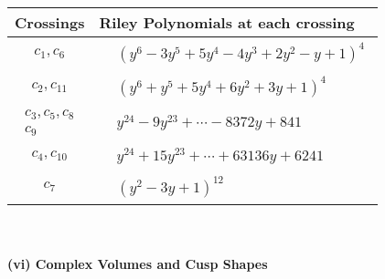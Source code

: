 \documentclass[1p]{elsarticle_modified}
\theoremstyle{definition}
\begin{document}
\begin{tabular}{m{50pt}|m{274pt}}
Crossings & \hspace{64pt}Riley Polynomials at each crossing \\
\hline $$\begin{aligned}c_{1},c_{6}\end{aligned}$$&$\begin{aligned}
&(y^6-3 y^5+5 y^4-4 y^3+2 y^2- y+1)^4
\end{aligned}$\\
\hline $$\begin{aligned}c_{2},c_{11}\end{aligned}$$&$\begin{aligned}
&(y^6+y^5+5 y^4+6 y^2+3 y+1)^4
\end{aligned}$\\
\hline $$\begin{aligned}c_{3},c_{5},c_{8}\\c_{9}\end{aligned}$$&$\begin{aligned}
&y^{24}-9 y^{23}+\cdots-8372 y+841
\end{aligned}$\\
\hline $$\begin{aligned}c_{4},c_{10}\end{aligned}$$&$\begin{aligned}
&y^{24}+15 y^{23}+\cdots+63136 y+6241
\end{aligned}$\\
\hline $$\begin{aligned}c_{7}\end{aligned}$$&$\begin{aligned}
&(y^2-3 y+1)^{12}
\end{aligned}$\\
\hline
\end{tabular}\\~\\
\newpage\flushleft \textbf{(vi) Complex Volumes and Cusp Shapes}
\end{document}
